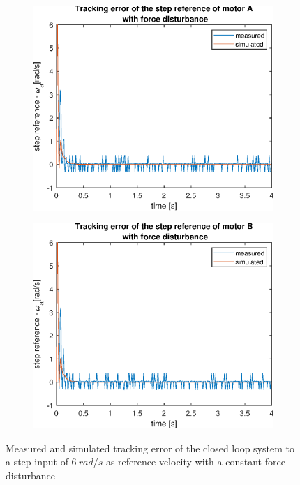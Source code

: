 \documentclass[a4paper,kul]{kulakarticle} %
\begin{document}
\begin{figure}[htp!]
	\centering
	\begin{subfigure}[b]{0.49\textwidth}
		\centering
		\includegraphics[width=\linewidth]{trackingerror_stepresponseA_FD.eps}
		
	\end{subfigure}
	\hfill
	\begin{subfigure}[b]{0.49\textwidth}  
		\centering
		\includegraphics[width=\linewidth]{trackingerror_stepresponseB_FD.eps}
		
	\end{subfigure}
	\caption{Measured and simulated tracking error of the closed loop system to a step input of $\SI{6}{rad/s}$ as reference velocity with a constant force disturbance}
	\label{fig:trackingerrorstepresponseFD}
\end{figure}
\end{document}
